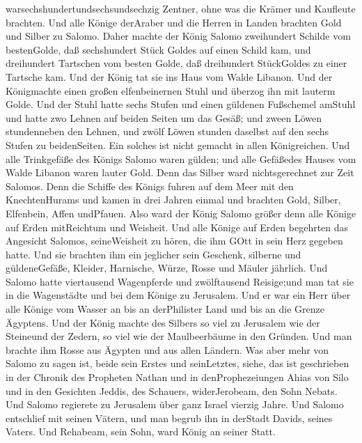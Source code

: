 warsechshundertundsechsundsechzig Zentner,  ohne was die
Krämer und Kaufleute brachten. Und alle Könige derAraber und die Herren
in Landen brachten Gold und Silber zu Salomo.  Daher machte
der König Salomo zweihundert Schilde vom bestenGolde, daß sechshundert
Stück Goldes auf einen Schild kam,  und dreihundert
Tartschen vom besten Golde, daß dreihundert StückGoldes zu einer
Tartsche kam.  Und der König tat sie ins Haus vom Walde
Libanon. Und der Königmachte einen großen elfenbeinernen Stuhl und
überzog ihn mit lauterm Golde.  Und der Stuhl hatte sechs
Stufen und einen güldenen Fußschemel amStuhl und hatte zwo Lehnen auf
beiden Seiten um das Gesäß; und zween Löwen stundenneben den Lehnen,
 und zwölf Löwen stunden daselbst auf den sechs Stufen zu
beidenSeiten. Ein solches ist nicht gemacht in allen Königreichen.
 Und alle Trinkgefäße des Königs Salomo waren gülden; und
alle Gefäßedes Hauses vom Walde Libanon waren lauter Gold. Denn das
Silber ward nichtsgerechnet zur Zeit Salomos.  Denn die
Schiffe des Königs fuhren auf dem Meer mit den KnechtenHurams und kamen
in drei Jahren einmal und brachten Gold, Silber, Elfenbein, Affen
undPfauen.  Also ward der König Salomo größer denn alle
Könige auf Erden mitReichtum und Weisheit.  Und alle Könige
auf Erden begehrten das Angesicht Salomos, seineWeisheit zu hören, die
ihm GOtt in sein Herz gegeben hatte.  Und sie brachten ihm
ein jeglicher sein Geschenk, silberne und güldeneGefäße, Kleider,
Harnische, Würze, Rosse und Mäuler jährlich.  Und Salomo
hatte viertausend Wagenpferde und zwölftausend Reisige;und man tat sie
in die Wagenstädte und bei dem Könige zu Jerusalem.  Und er
war ein Herr über alle Könige vom Wasser an bis an derPhilister Land und
bis an die Grenze Ägyptens.  Und der König machte des
Silbers so viel zu Jerusalem wie der Steineund der Zedern, so viel wie
der Maulbeerbäume in den Gründen.  Und man brachte ihm
Rosse aus Ägypten und aus allen Ländern.  Was aber mehr von
Salomo zu sagen ist, beide sein Erstes und seinLetztes, siehe, das ist
geschrieben in der Chronik des Propheten Nathan und in denProphezeiungen
Ahias von Silo und in den Gesichten Jeddis, des Schauers, widerJerobeam,
den Sohn Nebats.  Und Salomo regierete zu Jerusalem über
ganz Israel vierzig Jahre.  Und Salomo entschlief mit
seinen Vätern, und man begrub ihn in derStadt Davids, seines Vaters. Und
Rehabeam, sein Sohn, ward König an seiner Statt.

